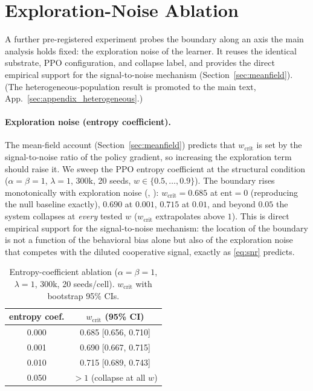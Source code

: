 \documentclass[letterpaper]{article}
\theoremstyle{plain}
\newcommand{\wcrit}{w_{\mathrm{crit}}}
\begin{document}
\section{Exploration-Noise Ablation}
\label{sec:appendix_robustness2}

A further pre-registered experiment probes the boundary along an axis the main
analysis holds fixed: the exploration noise of the learner. It reuses the
identical substrate, PPO configuration, and collapse label, and provides the
direct empirical support for the signal-to-noise mechanism
(Section~\ref{sec:meanfield}). (The heterogeneous-population result is promoted
to the main text, App.~\ref{sec:appendix_heterogeneous}.)

\paragraph{Exploration noise (entropy coefficient).}
The mean-field account (Section~\ref{sec:meanfield}) predicts that $\wcrit$ is set by
the signal-to-noise ratio of the policy gradient, so increasing the exploration
term should raise it. We sweep the PPO entropy coefficient at the structural
condition ($\alpha{=}\beta{=}1$, $\lambda{=}1$, 300k, 20 seeds, $w\in\{0.5,
\ldots,0.9\}$). The boundary rises monotonically with exploration noise
(, ): $\wcrit = 0.685$ at $\text{ent}{=}0$
(reproducing the null baseline exactly), $0.690$ at $0.001$, $0.715$ at $0.01$,
and beyond $0.05$ the system collapses at \emph{every} tested $w$
($\wcrit$ extrapolates above $1$). This is direct empirical support for the
signal-to-noise mechanism: the location of the boundary is not a function of the
behavioral bias alone but also of the exploration noise that competes with the
diluted cooperative signal, exactly as \eqref{eq:snr} predicts.

\begin{table}[h]
\centering
\caption{Entropy-coefficient ablation ($\alpha{=}\beta{=}1$, $\lambda{=}1$,
300k, 20 seeds/cell). $\wcrit$ with bootstrap 95\% CIs.}
\label{tab:entropy}
\small
\begin{tabular}{cc}
\toprule
entropy coef. & $\wcrit$ (95\% CI) \\
\midrule
0.000 & 0.685 [0.656, 0.710] \\
0.001 & 0.690 [0.667, 0.715] \\
0.010 & 0.715 [0.689, 0.743] \\
0.050 & $>1$ (collapse at all $w$) \\
\bottomrule
\end{tabular}
\end{table}
\end{document}
